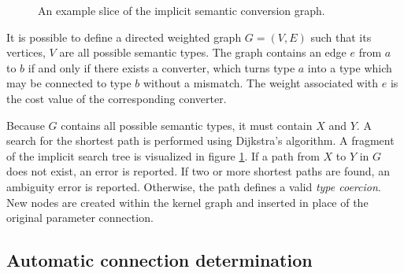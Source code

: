 \begin{figure}[h!]
  \centering
    \caption[Implicit semantic search tree]{An example slice of the implicit semantic conversion graph.}
  \label{fig:SemanticSearchGraph}
\end{figure}

It is possible to define a directed weighted graph $G=(V, E)$ such that its vertices, $V$ are all possible semantic types. The graph contains an edge $e$ from $a$ to $b$ if and only if there exists a converter, which turns type $a$ into a type which may be connected to type $b$ without a mismatch. The weight associated with $e$ is the cost value of the corresponding converter.

Because $G$ contains all possible semantic types, it must contain $X$ and $Y$. A search for the shortest path is performed using Dijkstra's algorithm. A fragment of the implicit search tree is visualized in figure \ref{fig:SemanticSearchGraph}. If a path from $X$ to $Y$ in $G$ does not exist, an error is reported. If two or more shortest paths are found, an ambiguity error is reported. Otherwise, the path defines a valid \emph{type coercion}. New nodes are created within the kernel graph and inserted in place of the original parameter connection.
	
\subsection{Automatic connection determination}

